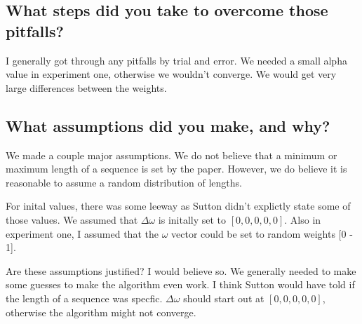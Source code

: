 \documentclass{article}
\begin{document}
\subsection{What steps did you take to overcome those pitfalls?}
\label{sec:orgheadline13}
I generally got through any pitfalls by trial and error. We needed a
small alpha value in experiment one, otherwise we wouldn't
converge. We would get very large differences between the weights. 

\subsection{What assumptions did you make, and why?}
\label{sec:orgheadline14}
We made a couple major assumptions. We do not believe that a minimum
or maximum length of a sequence is set by the paper. However, we do believe it is
reasonable to assume a random distribution of lengths.

For inital values, there was some leeway as Sutton didn't explictly
state some of those values.  We assumed that \(\Delta\omega\) is
initally set to \([0,0,0,0,0]\). Also in experiment one, I assumed that
the \(\omega\) vector could be set to random weights [0 - 1]. 

Are these assumptions justified? I would believe so. We generally
needed to make some guesses to make the algorithm even work. I think
Sutton would have told if the length of a sequence was
specfic. \(\Delta\omega\) should start out at \([0,0,0,0,0]\), otherwise
the algorithm might not converge. 
\end{document}
